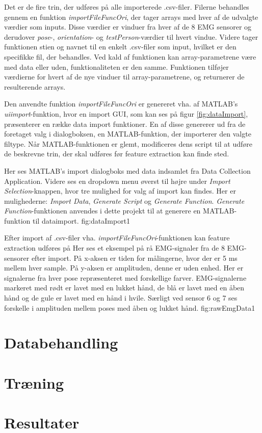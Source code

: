 Det er de fire trin, der udføres på alle importerede .csv-filer. Filerne behandles gennem en funktion \textit{importFileFuncOri}, der tager arrays med hver af de udvalgte værdier som inputs. Disse værdier er vinduer fra hver af de 8 EMG sensorer og derudover \textit{pose}-, \textit{orientation}- og \textit{testPerson}-værdier til hvert vindue. Videre tager funktionen stien og navnet til en enkelt .csv-filer som input, hvilket er den specifikke fil, der behandles. Ved kald af funktionen kan array-parametrene være med data eller uden, funktionaliteten er den samme. Funktionen tilføjer værdierne for hvert af de nye vinduer til array-parametrene, og returnerer de resulterende arrays. 

Den anvendte funktion \textit{importFileFuncOri} er genereret vha. af MATLAB's \textit{uiimport}-funktion\citep{matlabUiimport}, hvor en import GUI, som kan ses på figur \ref{fig:dataImport}, præsenterer en række data import funktioner. En af disse genererer ud fra de foretaget valg i dialogboksen, en MATLAB-funktion, der importerer den valgte filtype. Når MATLAB-funktionen er glemt, modificeres dens script til at udføre de beskrevne trin, der skal udføres før feature extraction kan finde sted.

{
	Her ses MATLAB's import dialogboks med data indsamlet fra Data Collection Application. Videre ses en dropdown menu øverst til højre under \textit{Import 		Selection}-knappen, hvor tre mulighed for valg af import kan findes. Her er mulighederne: \textit{Import Data}, \textit{Generate Script} og \textit{Generate Function}. \textit{Generate Function}-funktionen anvendes i dette projekt til at generere en MATLAB-funktion til dataimport.
 }{fig:dataImport}{1}

 
 
 
Efter import af .csv-filer vha. \textit{importFileFuncOri}-funktionen kan feature extraction udføres på 
{
	Her ses et eksempel på rå EMG-signaler fra de 8 EMG-sensorer efter import. På x-aksen er tiden for målingerne, hvor der er 5 ms mellem hver sample. På y-aksen er amplituden, denne er uden enhed. Her er signalerne fra hver pose repræsenteret med forskellige farver. EMG-signalerne markeret med rødt er lavet med en lukket hånd, de blå er lavet med en åben hånd og de gule er lavet med en hånd i hvile. Særligt ved sensor 6 og 7 ses forskelle i amplituden mellem poses med åben og lukket hånd. 
 }{fig:rawEmgData}{1}

\section{Databehandling}

\section{Træning}

\section{Resultater}
